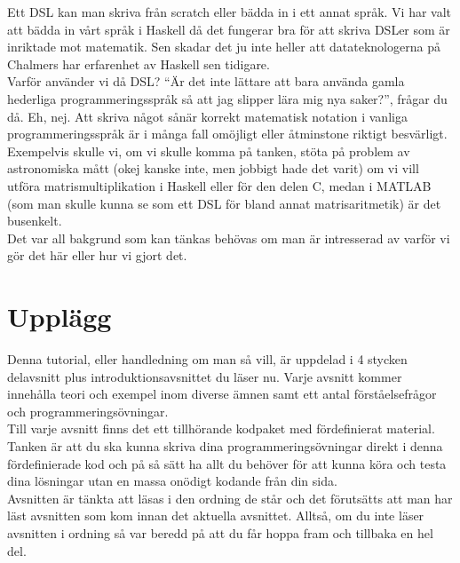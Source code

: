 \documentclass{article}
\begin{document}
Ett DSL kan man skriva från scratch eller bädda in i ett annat språk. Vi har valt att bädda in vårt språk i Haskell då det fungerar bra för att skriva DSLer som är inriktade mot matematik. Sen skadar det ju inte heller att datateknologerna på Chalmers har erfarenhet av Haskell sen tidigare.\\

Varför använder vi då DSL? “Är det inte lättare att bara använda gamla hederliga programmeringsspråk så att jag slipper lära mig nya saker?”, frågar du då. Eh, nej. Att skriva något sånär korrekt matematisk notation i vanliga programmeringsspråk är i många fall omöjligt eller åtminstone riktigt besvärligt. \\
Exempelvis skulle vi, om vi skulle komma på tanken, stöta på problem av astronomiska mått (okej kanske inte, men jobbigt hade det varit) om vi vill utföra matrismultiplikation i Haskell eller för den delen C, medan i MATLAB (som man skulle kunna se som ett DSL för bland annat matrisaritmetik) är det busenkelt.\\

Det var all bakgrund som kan tänkas behövas om man är intresserad av varför vi gör det här eller hur vi gjort det.



\section{Upplägg}
Denna tutorial, eller handledning om man så vill, är uppdelad i 4 stycken delavsnitt plus introduktionsavsnittet du läser nu. Varje avsnitt kommer innehålla teori och exempel inom diverse ämnen samt ett antal förståelsefrågor och programmeringsövningar. \\

Till varje avsnitt finns det ett tillhörande kodpaket med fördefinierat material. Tanken är att du ska kunna skriva dina programmeringsövningar direkt i denna fördefinierade kod och på så sätt ha allt du behöver för att kunna köra och testa dina lösningar utan en massa onödigt kodande från din sida.\\

Avsnitten är tänkta att läsas i den ordning de står och det förutsätts att man har läst avsnitten som kom innan det aktuella avsnittet. Alltså, om du inte läser avsnitten i ordning så var beredd på att du får hoppa fram och tillbaka en hel del.
\end{document}
